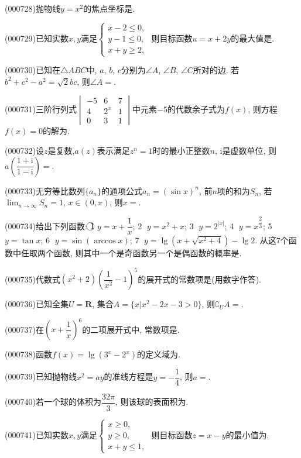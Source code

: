 \item (000728)抛物线$y=x^2$的焦点坐标是.
\item (000729)已知实数$x,y$满足$\begin{cases} x-2\le 0, \\ y-1\le 0, \\ x+y\ge 2,\end{cases}$ 则目标函数$u=x+2y$的最大值是.
\item (000730)已知在$\triangle ABC$中, $a$, $b$, $c$分别为$\angle A$, $\angle B$, $\angle C$所对的边. 若$b^2+c^2-a^2=\sqrt{2}bc$, 则$\angle A=$.
\item (000731)三阶行列式$\begin{vmatrix}-5 & 6 & 7  \\ 4 & 2^x & 1  \\ 0 & 3 & 1  \end{vmatrix}$中元素$-5$的代数余子式为$f(x)$, 则方程$f(x)=0$的解为.
\item (000732)设$z$是复数,$a(z)$表示满足$z^n=1$时的最小正整数$n$, $\mathrm{i}$是虚数单位, 则$a(\dfrac{1+\mathrm{i}}{1-\mathrm{i}})=$.
\item (000733)无穷等比数列$\{a_n\}$的通项公式$a_n=(\sin x)^n$, 前$n$项的和为$S_n$, 若$\displaystyle\lim_{n\to\infty}S_n=1$, $x\in (0,\pi)$, 则$x=$.
\item (000734)给出下列函数: \textcircled{1} $y=x+\dfrac1x$; \textcircled{2} $y={x^2}+x$; \textcircled{3} $y={2^{|x|}}$; \textcircled{4} $y={x^{\dfrac23}}$; \textcircled{5} $y=\tan x$; \textcircled{6} $y=\sin(\arccos x)$; \textcircled{7} $y=\lg(x+\sqrt{{x^2}+4})-\lg 2$. 从这$7$个函数中任取两个函数, 则其中一个是奇函数另一个是偶函数的概率是.
\item (000735)代数式$(x^2+2)(\dfrac1{x^2}-1)^5$的展开式的常数项是(用数字作答).
\item (000736)已知全集$U=\mathbf{R}$, 集合$A=\{x|x^2-2x-3>0\}$, 则$\complement_U A=$.
\item (000737)在$(x+\dfrac1x)^6$的二项展开式中, 常数项是.
\item (000738)函数$f(x)=\lg (3^x-2^x)$的定义域为.
\item (000739)已知抛物线$x^2=ay$的准线方程是$y=-\dfrac14$, 则$a=$.
\item (000740)若一个球的体积为$\dfrac{32\pi}3$, 则该球的表面积为.
\item (000741)已知实数$x,y$满足$\begin{cases} x\ge 0, \\ y\ge 0, \\ x+y\le 1, \end{cases}$ 则目标函数$z=x-y$的最小值为.
